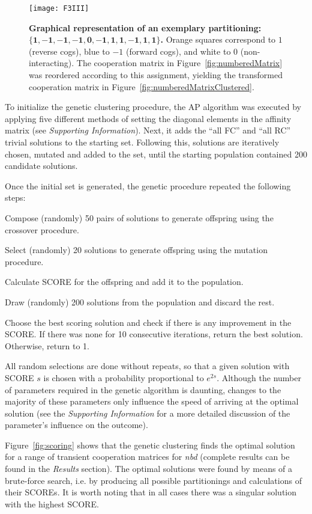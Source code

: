 \documentclass[a4paper,11pt,twoside]{book}%
\begin{document}
\begin{figure}[h!]
\centering
\texttt{[image: F3III]}
\caption{
{\bf Graphical representation of an exemplary partitioning: $\mathbf{\{1,-1,-1,-1,0,-1,1,1,-1,1,1 \}}$.}
Orange squares correspond to $1$ (reverse cogs), blue  to $-1$ (forward cogs), and white to $0$ (non-interacting).
The cooperation matrix in Figure~\ref{fig:numberedMatrix} was reordered according to this assignment, yielding the transformed cooperation matrix in Figure~\ref{fig:numberedMatrixClustered}.
}
\label{fig:numberedStripe}
\end{figure}

To initialize the genetic clustering procedure, the AP algorithm was {\color{black}executed by applying} five different methods of setting the diagonal elements in the affinity matrix (see \emph{Supporting Information}).
Next, it adds the ``all FC'' and ``all RC'' trivial solutions to the starting set.
Following this, solutions are iteratively chosen, mutated and added to the set, until the starting population contained 200 candidate solutions.

Once the initial set is generated, the genetic procedure repeated the following steps:
\begin{packedenum}
 \item Compose (randomly) 50 pairs of solutions to generate offspring using the crossover procedure.
 \item Select (randomly) 20 solutions to generate offspring using the mutation procedure.
 \item Calculate SCORE for the offspring and add it to the population.
 \item Draw (randomly) 200 solutions from the population and discard the rest.
 \item Choose the best scoring solution and check if there is any improvement in the SCORE. If there was none for 10 consecutive iterations, return the best solution. Otherwise, return to 1.
\end{packedenum}
All random selections are done without repeats, so that a given solution with SCORE $s$ is chosen with a probability proportional to $e^{2s}$.
{\color{black}Although} the number of parameters required in the genetic algorithm is daunting, changes to the majority of these parameters only influence the speed of arriving at the optimal solution (see the \emph{Supporting Information} for a more detailed discussion of the parameter's influence on the outcome).

Figure~\ref{fig:scoring} shows that the genetic clustering finds the optimal solution for a range of transient cooperation matrices for \emph{nbd} (complete results can be found in {\color{black}the \emph{Results} section}).
The optimal solution{\color{black}s were} found by means of a brute-force search, i.e. by producing all possible partitionings and calculations of their SCOREs.
It is worth noting that in all cases there was a singular solution with the highest SCORE.
\end{document}
